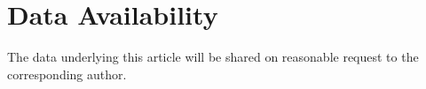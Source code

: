 \documentclass[fleqn,usenatbib]{rasti}
\begin{document}
\section*{Data Availability}
 
The data underlying this article will be shared on reasonable request to the corresponding author.

\bsp	%
\label{lastpage}
\end{document}
